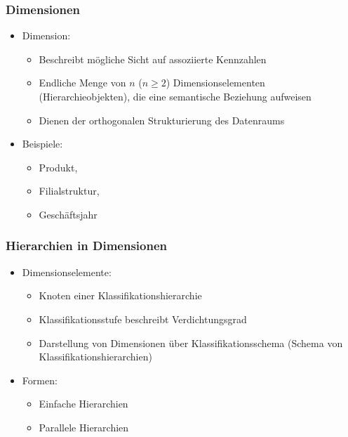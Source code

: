 
        \begin{frame}

        \frametitle{Dimensionen}
        \begin{itemize}
        \item Dimension:
        \begin{itemize}
        \item Beschreibt mögliche Sicht auf assoziierte Kennzahlen
        \item Endliche Menge von $n$ ($n \geq 2$) Dimensionselementen
          (Hierarchieobjekten), die eine semantische Beziehung aufweisen
        \item Dienen der orthogonalen Strukturierung des Datenraums
        \end{itemize}
        \item Beispiele:
        \begin{itemize}
            \item Produkt,
            \item Filialstruktur,
            \item Geschäftsjahr
        \end{itemize}
        \end{itemize}

        \end{frame}

        \begin{frame}

        \frametitle{Hierarchien in Dimensionen}
        \begin{itemize}
        \item Dimensionselemente:
        \begin{itemize}
        \item Knoten einer Klassifikationshierarchie
        \item Klassifikationsstufe beschreibt Verdichtungsgrad
        \item Darstellung von Dimensionen über Klassifikationsschema (Schema
          von Klassifikationshierarchien)
        \end{itemize}
        \item Formen:
        \begin{itemize}
        \item Einfache Hierarchien
        \item Parallele Hierarchien
        \end{itemize}
        \end{itemize}
        \end{frame}

